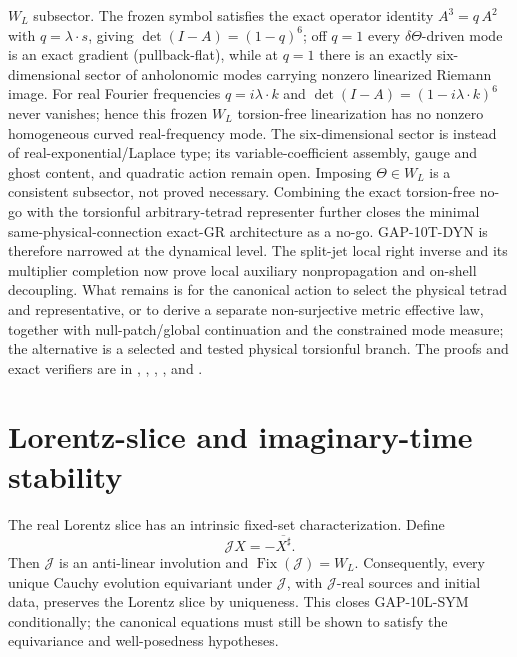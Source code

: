 \documentclass[12pt,a4paper]{article}
\theoremstyle{remark}\newtheorem{remark}[definition]{Remark}
\begin{document}
$W_L$ subsector.  The frozen symbol satisfies the exact operator identity
$A^3=q\,A^2$ with $q=\lambda\!\cdot\!s$, giving
$\det(I-A)=(1-q)^6$; off $q=1$ every $\delta\Theta$-driven mode is an
exact gradient (pullback-flat), while at $q=1$ there is an exactly
six-dimensional sector of anholonomic modes carrying nonzero linearized
Riemann image.  For real Fourier frequencies $q=i\lambda\!\cdot\!k$ and
$\det(I-A)=(1-i\lambda\!\cdot\!k)^6$ never vanishes; hence this frozen
$W_L$ torsion-free linearization has no nonzero homogeneous curved
real-frequency mode.  The six-dimensional sector is instead of
real-exponential/Laplace type; its variable-coefficient assembly, gauge and
ghost content, and quadratic action remain open.  Imposing $\Theta\in W_L$ is a consistent
subsector, not proved necessary.  Combining the exact torsion-free no-go
with the torsionful arbitrary-tetrad representer further closes the minimal
same-physical-connection exact-GR architecture as a no-go.  GAP-10T-DYN is
therefore narrowed at the dynamical level.  The split-jet local right inverse
and its multiplier completion now prove local auxiliary nonpropagation and
on-shell decoupling.  What remains is for the canonical action to select the
physical tetrad and representative, or to derive a separate non-surjective
metric effective law, together with null-patch/global continuation and the
constrained mode measure; the alternative is a selected and tested physical
torsionful branch.  The proofs and
exact verifiers are in
,
,
,
, and
.

\section{Lorentz-slice and imaginary-time stability}
The real Lorentz slice has an intrinsic fixed-set characterization.  Define
\begin{equation}
 \mathcal JX=-\overline{X^\sharp}.
\end{equation}
Then $\mathcal J$ is an anti-linear involution and
$\operatorname{Fix}(\mathcal J)=W_L$.  Consequently, every unique Cauchy
evolution equivariant under $\mathcal J$, with $\mathcal J$-real sources and
initial data, preserves the Lorentz slice by uniqueness.  This closes
GAP-10L-SYM conditionally; the canonical equations must still be shown to
satisfy the equivariance and well-posedness hypotheses.
\end{document}
